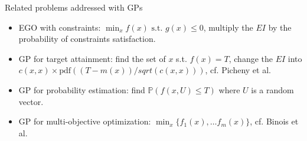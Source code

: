 \documentclass{beamer}
\begin{document}
\begin{frame}{}
\begin{exampleblock}{Related problems addressed with GPs}
\begin{itemize}
\item EGO with constraints: $\min_x f(x) \text{ s.t. } g(x) \le 0$, multiply the $EI$ by the probability of constraints satisfaction.
\item GP for target attainment: find the set of $x$ s.t. $f(x) = T$, change the $EI$ into $c(x,x) \times \text{pdf}\left((T-m(x))/sqrt(c(x,x))\right)$, cf. Picheny et al.
\item GP for probability estimation: find $\mathds P (f(x,U)\le T) $ where $U$ is a random vector.
\item GP for multi-objective optimization: $\min_x \{f_1(x), \dots f_m(x)\}$, cf. Binois et al.
\end{itemize}
\end{exampleblock}
\end{frame}


\end{document}
